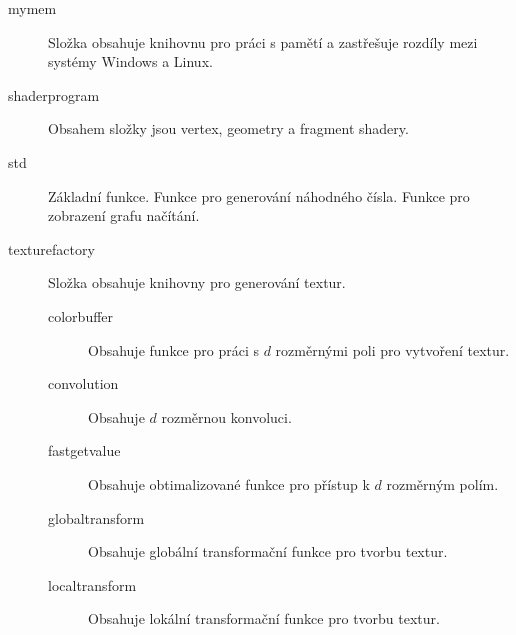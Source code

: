 \begin{description}
\item[mymem] Složka obsahuje knihovnu pro práci s pamětí a zastřešuje rozdíly mezi systémy Windows a Linux.
\item[shaderprogram] Obsahem složky jsou vertex, geometry a fragment shadery.
\item[std] Základní funkce.
Funkce pro generování náhodného čísla.
Funkce pro zobrazení grafu načítání. 

\item[texturefactory] Složka obsahuje knihovny pro generování textur.
\begin{description}
\item[colorbuffer] Obsahuje funkce pro práci s $d$ rozměrnými poli pro vytvoření textur.
\item[convolution] Obsahuje $d$ rozměrnou konvoluci.
\item[fastgetvalue] Obsahuje obtimalizované funkce pro přístup k $d$ rozměrným polím.
\item[globaltransform] Obsahuje globální transformační funkce pro tvorbu textur.
\item[localtransform] Obsahuje lokální transformační funkce pro tvorbu textur.
\end{description}



\end{description}

